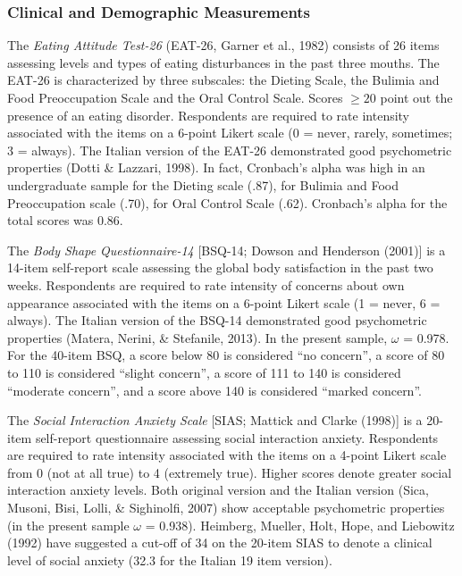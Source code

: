 \documentclass[
  man,floatsintext]{apa6}
\begin{document}
\hypertarget{clinical-and-demographic-measurements}{%
\subsubsection{Clinical and Demographic Measurements}\label{clinical-and-demographic-measurements}}

The \emph{Eating Attitude Test-26} (EAT-26, Garner et al., 1982) consists of 26 items assessing levels and types of eating disturbances in the past three mouths. The EAT-26 is characterized by three subscales: the Dieting Scale, the Bulimia and Food Preoccupation Scale and the Oral Control Scale. Scores \(\ge 20\) point out the presence of an eating disorder. Respondents are required to rate intensity associated with the items on a 6-point Likert scale (0 = never, rarely, sometimes; 3 = always).
The Italian version of the EAT-26 demonstrated good psychometric properties (Dotti \& Lazzari, 1998). In fact, Cronbach's alpha was high in an undergraduate sample for the Dieting scale (.87), for Bulimia and Food Preoccupation scale (.70), for Oral Control Scale (.62). Cronbach's alpha for the total scores was 0.86.

The \emph{Body Shape Questionnaire-14} {[}BSQ-14; Dowson and Henderson (2001){]} is a 14-item self-report scale assessing the global body satisfaction in the past two weeks. Respondents are required to rate intensity of concerns about own appearance associated with the items on a 6-point Likert scale (1 = never, 6 = always). The Italian version of the BSQ-14 demonstrated good psychometric properties (Matera, Nerini, \& Stefanile, 2013). In the present sample, \(\omega\) = 0.978. For the 40-item BSQ, a score below 80 is considered ``no concern'', a score of 80 to 110 is considered ``slight concern'', a score of 111 to 140 is considered ``moderate concern'', and a score above 140 is considered ``marked concern''.

The \emph{Social Interaction Anxiety Scale} {[}SIAS; Mattick and Clarke (1998){]} is a 20-item self-report questionnaire assessing social interaction anxiety. Respondents are required to rate intensity associated with the items on a 4-point Likert scale from 0 (not at all true) to 4 (extremely true). Higher scores denote greater social interaction anxiety levels. Both original version and the Italian version (Sica, Musoni, Bisi, Lolli, \& Sighinolfi, 2007) show acceptable psychometric properties (in the present sample \(\omega\) = 0.938). Heimberg, Mueller, Holt, Hope, and Liebowitz (1992) have suggested a cut-off of 34 on the 20-item SIAS to denote a clinical level of social anxiety (32.3 for the Italian 19 item version).
\end{document}
